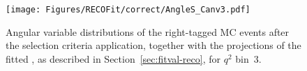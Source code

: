 

\begin{figure}[!hbt]
  \centering
  \texttt{[image: Figures/RECOFit/correct/AngleS\_Canv3.pdf]}
  \caption{Angular variable distributions of the right-tagged MC events after the selection criteria application, together with the projections of the fitted \pdf, as described in Section~\ref{sec:fitval-reco}, for $q^2$ bin~3.}
  \label{fig:rtag-bin3}
\end{figure}



